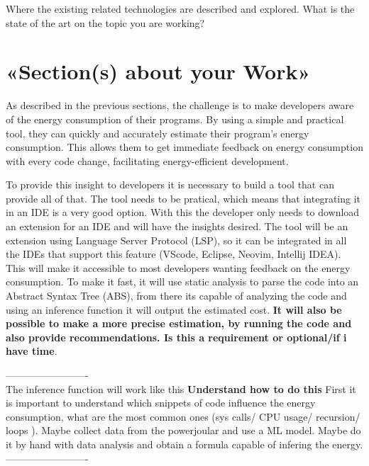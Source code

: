 \documentclass[sigplan]{acmart}
\begin{document}
% 

Where the existing related technologies are described and explored. What is the state of the art on the topic you are working? 



\section{«Section(s) about your Work»} \label{sec:work1}

As described in the previous sections, the challenge is to make developers aware of the energy consumption of their programs. By using a simple and practical tool, they can quickly and accurately estimate their program's energy consumption. This allows them to get immediate feedback on energy consumption with every code change, facilitating energy-efficient development.

To provide this insight to developers it is necessary to build a tool that can provide all of that. The tool needs to be pratical, which means that integrating it in an IDE is a very good option. With this the developer only needs to download an extension for an IDE and will have the insights desired.
The tool will be an extension using Language Server Protocol (LSP), so it can be integrated in all the IDEs that support this feature (VScode, Eclipse, Neovim, Intellij IDEA). This will make it accessible to most developers wanting feedback on the energy consumption. To make it fast, it will use static analysis to parse the code into an Abstract Syntax Tree (ABS), from there its capable of analyzing the code and using an inference function it will output the estimated cost. \textbf{It will also be possible to make a more precise estimation, by running the code and also provide recommendations. Is this a requirement or optional/if i have time}.

-------------------------\\
The inference function will work like this \textbf{Understand how to do this}
First it is important to understand which snippets of code influence the energy consumption, what are the most common ones (sys calls/ CPU usage/ recursion/ loops ).
Maybe collect data from the powerjoular and use a ML model.
Maybe do it by hand with data analysis and obtain a formula capable of infering the energy.
-------------------------\\
\end{document}
